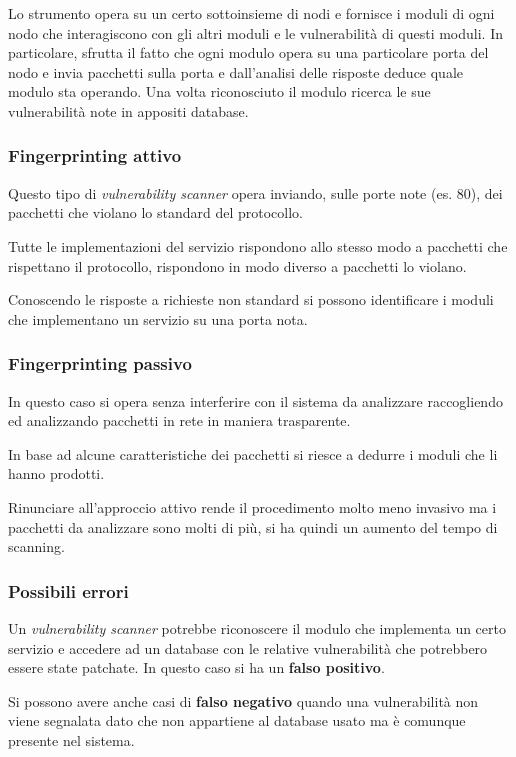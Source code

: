 Lo strumento opera su un certo sottoinsieme di nodi e fornisce i moduli di ogni nodo che interagiscono con gli altri
moduli e le vulnerabilità di questi moduli. In particolare, sfrutta il fatto che ogni modulo opera su una particolare
porta del nodo e invia pacchetti sulla porta e dall'analisi delle risposte deduce quale modulo sta operando. Una volta
riconosciuto il modulo ricerca le sue vulnerabilità note in appositi database.

\subsubsection{Fingerprinting attivo}
Questo tipo di \emph{vulnerability scanner} opera inviando, sulle porte note (es. 80), dei pacchetti che violano lo
standard del protocollo.

Tutte le implementazioni del servizio rispondono allo stesso modo a pacchetti che rispettano il protocollo, rispondono
in modo diverso a pacchetti lo violano.

Conoscendo le risposte a richieste non standard si possono identificare i moduli che implementano un servizio su una
porta nota.

\subsubsection{Fingerprinting passivo}
In questo caso si opera senza interferire con il sistema da analizzare raccogliendo ed analizzando pacchetti in rete
in maniera trasparente.

In base ad alcune caratteristiche dei pacchetti si riesce a dedurre i moduli che li hanno prodotti.

Rinunciare all'approccio attivo rende il procedimento molto meno invasivo ma i pacchetti da analizzare sono molti di
più, si ha quindi un aumento del tempo di scanning.

\subsubsection{Possibili errori}
Un \emph{vulnerability scanner} potrebbe riconoscere il modulo che implementa un certo servizio e accedere ad un
database con le relative vulnerabilità che potrebbero essere state patchate. In questo caso si ha un \textbf{falso
	positivo}.

Si possono avere anche casi di \textbf{falso negativo} quando una vulnerabilità non viene segnalata dato che non
appartiene al database usato ma è comunque presente nel sistema.

